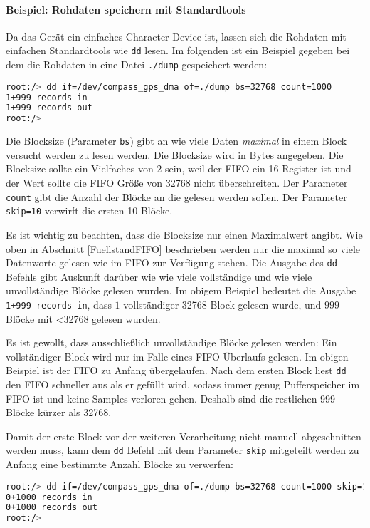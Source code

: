 \paragraph{Beispiel: Rohdaten speichern mit Standardtools}
Da das Gerät ein einfaches Character Device ist, lassen sich die Rohdaten mit einfachen Standardtools wie \lstinline$dd$ lesen. Im folgenden ist ein Beispiel gegeben bei dem die Rohdaten in eine Datei \lstinline$./dump$ gespeichert werden: 

\begin{lstlisting}[language=bash, deletekeywords={if}]
root:/> dd if=/dev/compass_gps_dma of=./dump bs=32768 count=1000
1+999 records in
1+999 records out
root:/> 
\end{lstlisting}

Die Blocksize (Parameter \lstinline$bs$) gibt an wie viele Daten \emph{maximal} in einem Block versucht werden zu lesen werden. Die Blocksize wird in Bytes angegeben. Die Blocksize sollte ein Vielfaches von 2 sein, weil der FIFO ein \SI{16}{\bit} Register ist und der Wert sollte die FIFO Größe von \SI{32768}{\byte} nicht überschreiten. Der Parameter \lstinline$count$ gibt die Anzahl der Blöcke an die gelesen werden sollen. Der Parameter \lstinline$skip=10$ verwirft die ersten 10 Blöcke.

Es ist wichtig zu beachten, dass die Blocksize nur einen Maximalwert angibt. Wie oben in Abschnitt \ref{FuellstandFIFO} beschrieben werden nur die maximal so viele Datenworte gelesen wie im FIFO zur Verfügung stehen. Die Ausgabe des \lstinline$dd$ Befehls gibt Auskunft darüber wie wie viele vollständige und wie viele unvollständige Blöcke gelesen wurden. Im obigem Beispiel bedeutet die Ausgabe \lstinline$1+999 records in$, dass $1$ vollständiger \SI{32768}{\byte} Block gelesen wurde, und $999$ Blöcke mit \SI{<32768}{\byte} gelesen wurden.

Es ist gewollt, dass ausschließlich unvollständige Blöcke gelesen werden: Ein vollständiger Block wird nur im Falle eines FIFO Überlaufs gelesen. Im obigen Beispiel ist der FIFO zu Anfang übergelaufen. Nach dem ersten Block liest \lstinline$dd$ den FIFO schneller aus als er gefüllt wird, sodass immer genug Pufferspeicher im FIFO ist und keine Samples verloren gehen. Deshalb sind die restlichen 999 Blöcke kürzer als \SI{32768}{\byte}.

Damit der erste Block vor der weiteren Verarbeitung nicht manuell abgeschnitten werden muss, kann dem \lstinline$dd$ Befehl mit dem Parameter \lstinline$skip$ mitgeteilt werden zu Anfang eine bestimmte Anzahl Blöcke zu verwerfen:

\begin{lstlisting}[language=bash, deletekeywords={if}]
root:/> dd if=/dev/compass_gps_dma of=./dump bs=32768 count=1000 skip=10
0+1000 records in
0+1000 records out
root:/> 
\end{lstlisting}
